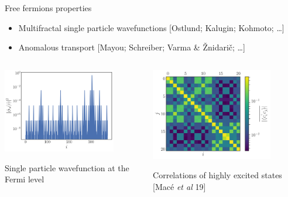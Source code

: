 \begin{frame}{Free fermions properties}
\begin{itemize}
	\item Multifractal single particle wavefunctions {\footnotesize[Ostlund; Kalugin; Kohmoto; \dots]}
	\item Anomalous transport {\footnotesize[Mayou; Schreiber; Varma \& Žnidarič; \dots]}
\end{itemize}
\begin{columns}
\begin{column}{0.5\textwidth}
\centering
\includegraphics[width=0.8\textwidth]{img/3_Fibonacci/presence_prob}

{\footnotesize Single particle wavefunction at the Fermi level}
\end{column}
\begin{column}{0.5\textwidth}
\includegraphics[width=0.8\textwidth]{img/3_Fibonacci/density_matrix_L21_h3}

{\footnotesize Correlations of highly excited states [Macé \emph{et al} 19]}
\end{column}
\end{columns}
\end{frame}

